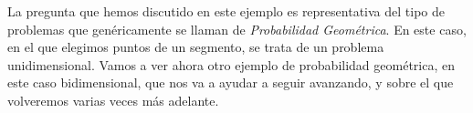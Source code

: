 La pregunta que hemos discutido en este ejemplo es representativa del tipo de problemas que genéricamente se llaman de {\em Probabilidad Geométrica}. En este caso, en el que elegimos puntos de un segmento, se trata de un problema unidimensional.
Vamos a ver ahora otro  ejemplo de probabilidad geométrica, en este caso bidimensional, que nos va a ayudar a seguir avanzando, y sobre el que volveremos varias veces más adelante.
